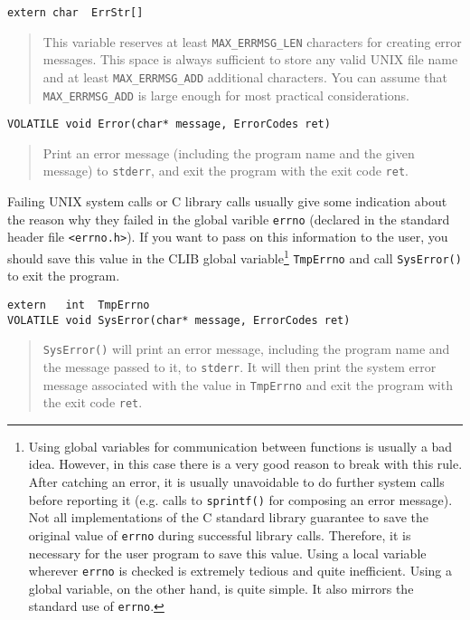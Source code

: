\begin{verbatim}
extern char  ErrStr[]
\end{verbatim}
\begin{quote}
  This variable reserves at least \texttt{MAX\_ERRMSG\_LEN} characters
  for creating error messages. This space is always sufficient to
  store any valid UNIX file name and at least
  \texttt{MAX\_ERRMSG\_ADD} additional characters.  You can assume
  that \texttt{MAX\_ERRMSG\_ADD} is large enough for most practical
  considerations.
\end{quote}

\begin{verbatim}
VOLATILE void Error(char* message, ErrorCodes ret)
\end{verbatim}
\begin{quote}
  Print an error message (including the program name and the given
  message) to \texttt{stderr}, and exit the program with the exit code
  \texttt{ret}.
\end{quote}

Failing UNIX system calls or C library calls usually give some
indication about the reason why they failed in the global varible
\texttt{errno} (declared in the standard header file
\texttt{<errno.h>}). If you want to pass on this information to the
user, you should save this value in the CLIB global
variable\footnote{Using global variables for communication between
  functions is usually a bad idea. However, in this case there is a
  very good reason to break with this rule. After catching an error,
  it is usually unavoidable to do further system calls before
  reporting it (e.g.  calls to \texttt{sprintf()} for composing an
  error message). Not all implementations of the C standard library
  guarantee to save the original value of \texttt{errno} during
  successful library calls.  Therefore, it is necessary for the user
  program to save this value.  Using a local variable wherever
  \texttt{errno} is checked is extremely tedious and quite
  inefficient. Using a global variable, on the other hand, is quite
  simple. It also mirrors the standard use of \texttt{errno}.}
\texttt{TmpErrno} and call \texttt{SysError()} to exit the program.

\begin{verbatim}
extern   int  TmpErrno
VOLATILE void SysError(char* message, ErrorCodes ret)
\end{verbatim}
\begin{quote}
  \texttt{SysError()} will print an error message, including the
  program name and the message passed to it, to \texttt{stderr}. It
  will then print the system error message associated with the value
  in \texttt{TmpErrno} and exit the program with the exit code
  \texttt{ret}.
\end{quote}

